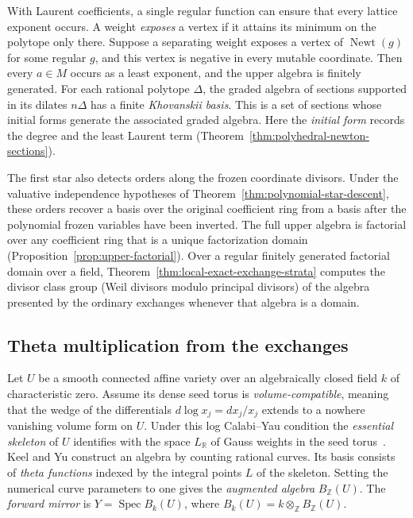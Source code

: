 \documentclass[11pt,reqno]{amsart}
\numberwithin{equation}{section}
\theoremstyle{definition}
\theoremstyle{remark}
\DeclareMathOperator{\Newt}{Newt}
\DeclareMathOperator{\Spec}{Spec}
\begin{document}
With Laurent coefficients, a single regular function can ensure that
every lattice exponent occurs. A weight \emph{exposes} a vertex if it
attains its minimum on the polytope only there. Suppose a separating
weight exposes a vertex of \(\Newt(g)\) for some regular \(g\), and this
vertex is negative in every mutable coordinate. Then every \(a\in M\)
occurs as a least exponent, and the upper algebra is finitely generated.
For each rational polytope \(\Delta\), the graded algebra of sections
supported in its dilates \(n\Delta\) has a finite \emph{Khovanskii basis}.
This is a set of sections whose initial forms generate the associated
graded algebra. Here the \emph{initial form} records the degree and the
least Laurent term (Theorem~\ref{thm:polyhedral-newton-sections}).

The first star also detects orders along the frozen coordinate divisors.
Under the valuative independence hypotheses of
Theorem~\ref{thm:polynomial-star-descent}, these orders recover a basis
over the original coefficient ring from a basis after the polynomial
frozen variables have been inverted. The full upper algebra is factorial
over any coefficient ring that is a unique factorization domain
(Proposition~\ref{prop:upper-factorial}). Over a regular finitely generated
factorial domain over a field, Theorem~\ref{thm:local-exact-exchange-strata}
computes the divisor class group (Weil divisors modulo principal
divisors) of the algebra presented by the ordinary exchanges whenever
that algebra is a domain.

\subsection*{Theta multiplication from the exchanges}
Let \(U\) be a smooth connected affine variety over an algebraically
closed field \(k\) of characteristic zero. Assume its dense seed torus
is \emph{volume-compatible}, meaning that the wedge of the differentials
\(d\log x_j=dx_j/x_j\) extends to a nowhere vanishing volume form on \(U\).
Under this log Calabi--Yau condition the \emph{essential skeleton} of
\(U\) identifies with the space \(L_{\mathbb R}\) of Gauss weights in
the seed torus~\cite[\S2 and Lemma~2.2]{KY}. Keel and Yu construct an
algebra by counting rational curves. Its basis consists of \emph{theta
functions} indexed by the integral points \(L\) of the skeleton.
Setting the numerical curve parameters to one gives the \emph{augmented
algebra} \(B_{\mathbb Z}(U)\). The \emph{forward mirror} is
\(Y=\Spec B_k(U)\), where \(B_k(U)=k\otimes_{\mathbb Z}B_{\mathbb Z}(U)\).
\end{document}
